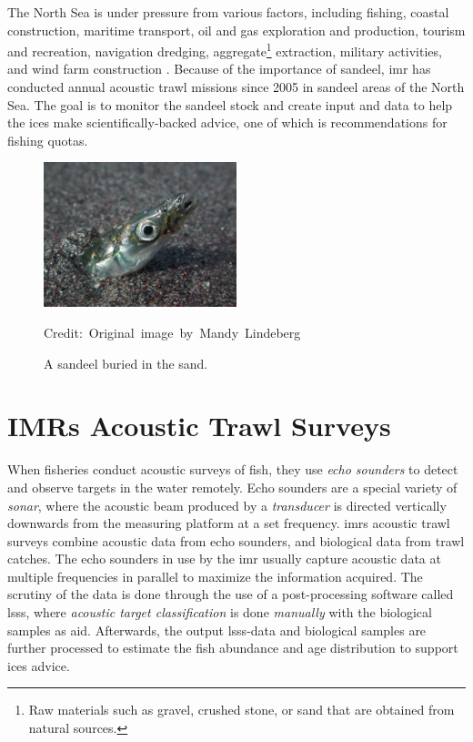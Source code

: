    The North Sea is under pressure from various factors, including fishing, coastal construction, maritime transport, oil and gas exploration and production, tourism and recreation, navigation dredging, aggregate\footnote{Raw materials such as gravel, crushed stone, or sand that are obtained from natural sources.} extraction, military activities, and wind farm construction \cite{ICES2021}. Because of the importance of sandeel, \gls{imr} has conducted annual acoustic trawl missions since 2005 in sandeel areas of the North Sea\cite{johnsen2017collective}. The goal is to monitor the sandeel stock and create input and data to help the \gls{ices} make scientifically-backed advice, one of which is recommendations for fishing quotas\cite{sizedependentfreqrespons2009johnsen}. 
    
    \begin{figure}[H]
        \centering

        \includegraphics[width=0.5\textwidth]{figures/Ammodytes_hexapterus.jpg} 

        \caption[Sandeel]{A sandeel buried in the sand.}
        \medskip 
        \hspace*{15pt}\hbox{\scriptsize Credit: Original image by Mandy Lindeberg\cite{sandeel_image}}
        \label{sandeel_image}
    \end{figure}

\section{IMRs Acoustic Trawl Surveys}
    When fisheries conduct acoustic surveys of fish, they use \textit{echo sounders} to detect and observe targets in the water remotely. Echo sounders are a special variety of \textit{sonar}, where the acoustic beam produced by a \textit{transducer} is directed vertically downwards from the measuring platform at a set frequency\cite{simmonds2008fisheries}. \gls{imr}s acoustic trawl surveys combine acoustic data from echo sounders, and biological data from trawl catches. The echo sounders in use by the \gls{imr} usually capture acoustic data at multiple frequencies in parallel to maximize the information acquired\cite{korneliussen2018acoustic}. The scrutiny of the data is done through the use of a post-processing software called \gls{lsss}, where \textit{acoustic target classification} is done \textit{manually} with the biological samples as aid\cite{korneliussen2006large}. Afterwards, the output \gls{lsss}-data and biological samples are further processed to estimate the fish abundance and age distribution to support \gls{ices} advice\cite{johnsen2019stox}. 

